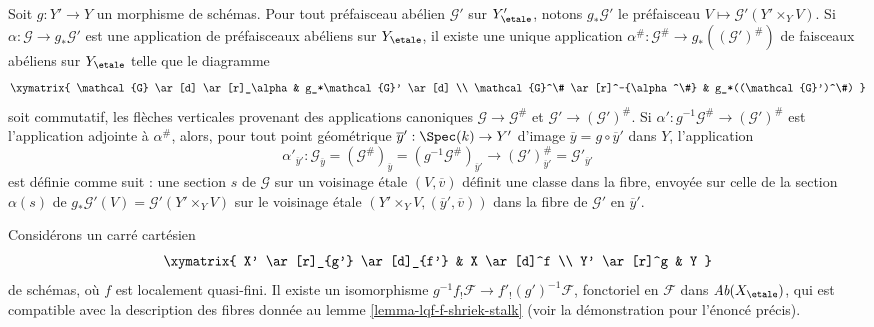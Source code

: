 \begin{remark}
\label{remark-construct-map-presheaves-downstairs}
Soit $g : Y' \to Y$ un morphisme de schémas.
Pour tout préfaisceau abélien $\mathcal{G}'$ sur $Y'_\etale$, notons
$g_*\mathcal{G}'$ le préfaisceau $V \mapsto \mathcal{G}'(Y' \times_Y V)$.
Si $\alpha : \mathcal{G} \to g_*\mathcal{G}'$ est une application de préfaisceaux abéliens
sur $Y_\etale$, il existe une unique application
$\alpha^\# : \mathcal{G}^\# \to g_*((\mathcal{G}')^\#)$
de faisceaux abéliens sur $Y_\etale$ telle que le diagramme
$$
\xymatrix{
\mathcal{G} \ar[d] \ar[r]_\alpha & g_*\mathcal{G}' \ar[d] \\
\mathcal{G}^\# \ar[r]^-{\alpha^\#} & g_*((\mathcal{G}')^\#)
}
$$
soit commutatif, les flèches verticales provenant des applications canoniques
$\mathcal{G} \to \mathcal{G}^\#$ et $\mathcal{G}' \to (\mathcal{G}')^\#$. Si
$\alpha' : g^{-1}\mathcal{G}^\# \to (\mathcal{G}')^\#$
est l'application adjointe à $\alpha^\#$, alors, pour tout point géométrique
$\overline{y}' : \Spec(k) \to Y'$ d'image
$\overline{y} = g \circ \overline{y}'$ dans $Y$, l'application
$$
\alpha'_{\overline{y}'} :
\mathcal{G}_{\overline{y}} =
(\mathcal{G}^\#)_{\overline{y}} =
(g^{-1}\mathcal{G}^\#)_{\overline{y}'}
\longrightarrow
(\mathcal{G}')^\#_{\overline{y}'} =
\mathcal{G}'_{\overline{y}'}
$$
est définie comme suit : une section $s$ de $\mathcal{G}$ sur un voisinage étale
$(V, \overline{v})$ définit une classe dans la fibre, envoyée sur celle de la section
$\alpha(s)$ de $g_*\mathcal{G}'(V) = \mathcal{G}'(Y' \times_Y V)$
sur le voisinage étale $(Y' \times_Y V, (\overline{y}', \overline{v}))$
dans la fibre de $\mathcal{G}'$ en $\overline{y}'$.
\end{remark}

\begin{lemma}
\label{lemma-lqf-base-change-f-shriek}
Considérons un carré cartésien
$$
\xymatrix{
X' \ar[r]_{g'} \ar[d]_{f'} & X \ar[d]^f \\
Y' \ar[r]^g & Y
}
$$
de schémas, où $f$ est localement quasi-fini. Il existe un isomorphisme
$g^{-1}f_!\mathcal{F} \to f'_!(g')^{-1}\mathcal{F}$, fonctoriel en
$\mathcal{F}$ dans $\textit{Ab}(X_\etale)$, qui est compatible avec
la description des fibres donnée au lemme \ref{lemma-lqf-f-shriek-stalk}
(voir la démonstration pour l'énoncé précis).
\end{lemma}

